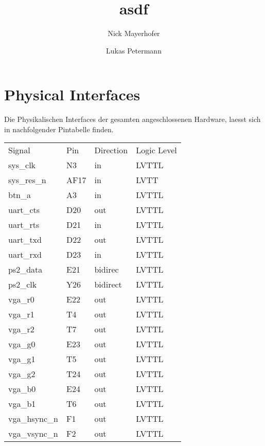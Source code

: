 \documentclass[a4paper,10pt]{scrreprt}
\title{asdf}
\author{Nick Mayerhofer}
\author{Lukas Petermann}
\begin{document}






\section{Physical Interfaces}
Die Physikalischen Interfaces der gesamten angeschlossenen Hardware, laesst sich
in nachfolgender Pintabelle finden.
\begin{table}[!ht]
 \begin{center}
  \begin{tabular}{|l|l|l|l|}
   \hline Signal & Pin &Direction &Logic Level\\
   sys\_clk & N3 & in & LVTTL\\
   sys\_res\_n & AF17 & in & LVTT\\
   btn\_a & A3 & in & LVTTL\\
   uart\_cts & D20 & out & LVTTL\\
   uart\_rts & D21 & in & LVTTL\\
   uart\_txd & D22 & out & LVTTL\\
   uart\_rxd & D23 & in & LVTTL\\
   ps2\_data & E21 & bidirec & LVTTL\\
   ps2\_clk & Y26 & bidirect & LVTTL\\
   vga\_r0 & E22 & out & LVTTL\\
   vga\_r1 & T4 & out & LVTTL\\
   vga\_r2 & T7 & out & LVTTL\\
   vga\_g0 & E23 & out & LVTTL\\
   vga\_g1 & T5 & out & LVTTL\\
   vga\_g2 & T24 & out & LVTTL\\
   vga\_b0 & E24 & out & LVTTL\\
   vga\_b1 & T6 & out & LVTTL\\
   vga\_hsync\_n & F1 & out & LVTTL\\
   vga\_vsync\_n & F2 & out & LVTTL\\
   \hline
  \end{tabular}
 \end{center}
\end{table}
\end{document}

